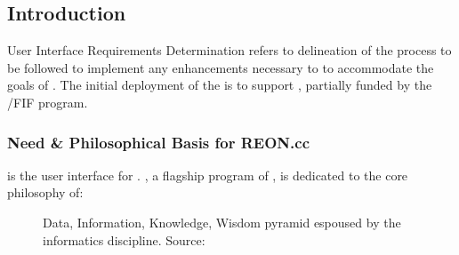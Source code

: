 \documentclass[letterpaper,12pt,english]{book}
\begin{document}
\subsection{Introduction}
\label{\detokenize{requirements/introduction/index:introduction}}\label{\detokenize{requirements/introduction/index::doc}}
\sphinxAtStartPar
User Interface Requirements Determination refers to delineation of the process to be followed to implement any enhancements necessary to {\hyperref[\detokenize{glossary:term-REON.cc}]{}} to accommodate the goals of {\hyperref[\detokenize{glossary:term-REON-WM}]{}}. The initial deployment of the {\hyperref[\detokenize{glossary:term-REON-WM}]{}} is to support {\hyperref[\detokenize{glossary:term-RGVFlood}]{}}, partially funded by the {\hyperref[\detokenize{glossary:term-TWDB}]{}}/FIF program.


\subsubsection{Need \& Philosophical Basis for REON.cc}
\label{\detokenize{requirements/introduction/need:need-philosophical-basis-for-reon-cc}}\label{\detokenize{requirements/introduction/need::doc}}
\sphinxAtStartPar
{\hyperref[\detokenize{glossary:term-REON.cc}]{}} is the user interface for {\hyperref[\detokenize{glossary:term-REON}]{}}. {\hyperref[\detokenize{glossary:term-REON}]{}}, a flagship program of {\hyperref[\detokenize{glossary:term-RATES}]{}}, is dedicated to the core philosophy of:

\sphinxAtStartPar
{}

\begin{figure}[htbp]
\centering
\capstart

\noindent{}
\caption{Data, Information, Knowledge, Wisdom pyramid espoused by the informatics discipline. Source: }\label{\detokenize{requirements/introduction/need:id1}}\end{figure}
\end{document}
